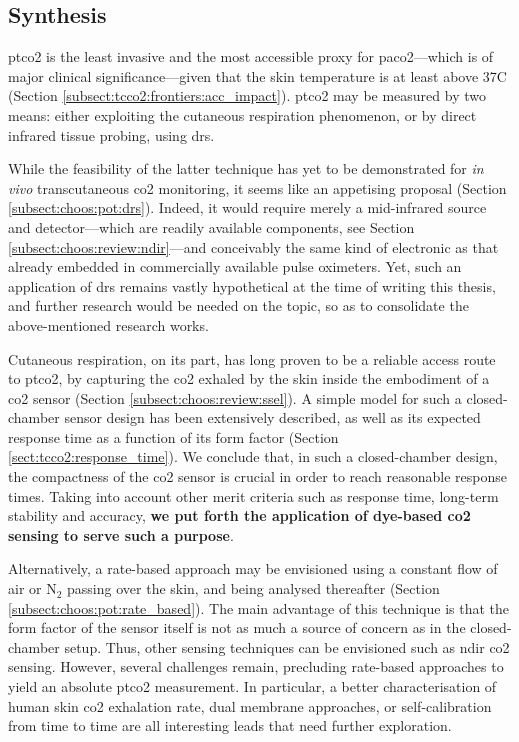 \subsection{Synthesis}

\gls{ptco2} is the least invasive and the most accessible proxy for \gls{paco2}---which is of major clinical significance---given that the skin temperature is at least above 37{\degree}C (Section \ref{subsect:tcco2:frontiers:acc_impact}). \gls{ptco2} may be measured by two means: either exploiting the cutaneous respiration phenomenon, or by direct infrared tissue probing, using \gls{drs}.

While the feasibility of the latter technique has yet to be demonstrated for \emph{in vivo} transcutaneous \gls{co2} monitoring, it seems like an appetising proposal (Section \ref{subsect:choos:pot:drs}). Indeed, it would require merely a mid-infrared source and detector---which are readily available components, see Section \ref{subsect:choos:review:ndir}---and conceivably the same kind of electronic as that already embedded in commercially available pulse oximeters. Yet, such an application of \gls{drs} remains vastly hypothetical at the time of writing this thesis, and \mfrin{}further research would be needed on the topic, so as to consolidate the above-mentioned research works.

Cutaneous respiration, on its part, has long proven to be a reliable access route to \gls{ptco2}, by capturing the \gls{co2} exhaled by the skin inside the embodiment of a \gls{co2} sensor (Section \ref{subsect:choos:review:ssel}). A simple model for such a closed-chamber sensor design has been extensively described, as well as its expected response time as a function of its form factor (Section \ref{sect:tcco2:response_time}). We conclude that, in such a closed-chamber design, the compactness of the \gls{co2} sensor is crucial in order to reach reasonable response times. Taking into account other merit criteria such as response time, long-term stability and accuracy, \textbf{we put forth the application of dye-based \gls{co2} sensing to serve such a purpose}.

Alternatively, a rate-based approach may be envisioned using a constant flow of air or N$_2$ passing over the skin, and being analysed thereafter (Section \ref{subsect:choos:pot:rate_based}). The main advantage of this technique is that the form factor of the sensor itself is not as much a source of concern as in the closed-chamber setup. Thus, other sensing techniques can be envisioned such as \gls{ndir} \gls{co2} sensing. However, several challenges remain, precluding rate-based approaches to yield an absolute \gls{ptco2} measurement. In particular, a better characterisation of human skin \gls{co2} exhalation rate, dual membrane approaches, or self-calibration from time to time are all interesting leads that need further exploration.

